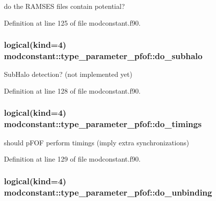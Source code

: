 do the R\-A\-M\-S\-E\-S files contain potential? 



Definition at line 125 of file modconstant.\-f90.

\hypertarget{structmodconstant_1_1type__parameter__pfof_a9f6178ca41c0ae971922f15f5399b2b5}{
\subsubsection[{do\-\_\-subhalo}]{\setlength{\rightskip}{0pt plus 5cm}logical(kind=4) modconstant\-::type\-\_\-parameter\-\_\-pfof\-::do\-\_\-subhalo}}\label{structmodconstant_1_1type__parameter__pfof_a9f6178ca41c0ae971922f15f5399b2b5}


Sub\-Halo detection? (not implemented yet) 



Definition at line 128 of file modconstant.\-f90.

\hypertarget{structmodconstant_1_1type__parameter__pfof_af646b4ae96b024905287fdb0b75305da}{
\subsubsection[{do\-\_\-timings}]{\setlength{\rightskip}{0pt plus 5cm}logical(kind=4) modconstant\-::type\-\_\-parameter\-\_\-pfof\-::do\-\_\-timings}}\label{structmodconstant_1_1type__parameter__pfof_af646b4ae96b024905287fdb0b75305da}


should p\-F\-O\-F perform timings (imply extra synchronizations) 



Definition at line 129 of file modconstant.\-f90.

\hypertarget{structmodconstant_1_1type__parameter__pfof_a4d8097905d8490a45d84b471ae1f5bb8}{
\subsubsection[{do\-\_\-unbinding}]{\setlength{\rightskip}{0pt plus 5cm}logical(kind=4) modconstant\-::type\-\_\-parameter\-\_\-pfof\-::do\-\_\-unbinding}}\label{structmodconstant_1_1type__parameter__pfof_a4d8097905d8490a45d84b471ae1f5bb8}


